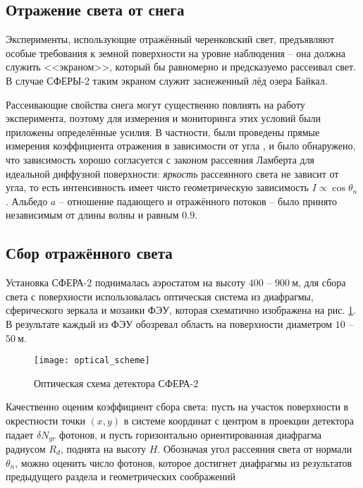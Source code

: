 \subsection{Отражение света от снега}
\label{sect:snow-reflection}

Эксперименты, использующие отражённый черенковский свет, предъявляют особые требования к земной поверхности на уровне наблюдения -- она должна служить <<экраном>>, который бы равномерно и предсказуемо рассеивал свет. В случае СФЕРЫ-2 таким экраном служит заснеженный лёд озера Байкал.

Рассеивающие свойства снега могут существенно повлиять на работу эксперимента, поэтому для измерения и мониторинга этих условий были приложены определённые усилия. В частности, были проведены прямые измерения коэффициента отражения в зависимости от угла \cite[рис.~11]{Sphere2015}, и было обнаружено, что зависимость хорошо согласуется с законом рассеяния Ламберта для идеальной диффузной поверхности: \textit{яркость} рассеянного света не зависит от угла, то есть интенсивность имеет чисто геометрическую зависимость $I \propto \cos \theta_n$ \cite{Antonov2019}. Альбедо $a$ -- отношение падающего и отражённого потоков -- было принято независимым от длины волны \cite{Warren1982} и равным $0.9$.

\subsection{Сбор отражённого света}
\label{sec:light-collection-from-surface}

Установка СФЕРА-2 поднималась аэростатом на высоту $400$ -- $900~\text{м}$, для сбора света с поверхности использовалась оптическая система из диафрагмы, сферического зеркала и мозаики ФЭУ, которая схематично изображена на рис. \ref{pic:sphere-detector-optical-scheme}. В результате каждый из ФЭУ обозревал область на поверхности диаметром $10$ -- $50~\text{м}$.

\begin{figure}
	\centering
	\texttt{[image: optical\_scheme]}
	\caption{Оптическая схема детектора СФЕРА-2}
	\label{pic:sphere-detector-optical-scheme}
\end{figure}

Качественно оценим коэффициент сбора света: пусть на участок поверхности в окрестности точки $(x, y)$ в системе координат с центром в проекции детектора падает $\delta N_{gr}$ фотонов, и пусть горизонтально ориентированная диафрагма радиусом $R_{d}$, поднята на высоту $H$. Обозначая угол рассеяния света от нормали $\theta_n$, можно оценить число фотонов, которое достигнет диафрагмы из результатов предыдущего раздела и геометрических соображений

